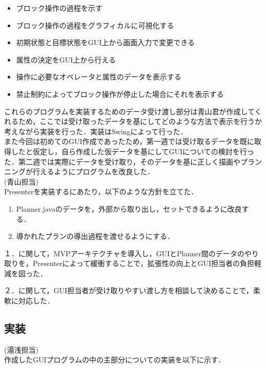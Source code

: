 \documentclass[uplatex,12pt]{jsarticle}
\begin{document}
\begin{itemize}
\item ブロック操作の過程を示す
\item ブロック操作の過程をグラフィカルに可視化する
\item 初期状態と目標状態をGUI上から画面入力で変更できる
\item 属性の決定をGUI上から行える
\item 操作に必要なオペレータと属性のデータを表示する
\item 禁止制約によってブロック操作が停止した場合にそれを表示する
\end{itemize}

これらのプログラムを実装するためのデータ受け渡し部分は青山君が作成してくれるため，ここでは受け取ったデータを基にしてどのような方法で表示を行うか考えながら実装を行った．実装はSwingによって行った．\\

また今回は初めてのGUI作成であったため，第一週では受け取るデータを既に取得したと仮定し，自ら作成した仮データを基にしてGUIについての検討を行った．第二週では実際にデータを受け取り，そのデータを基に正しく描画やプランニングが行えるようにプログラムを改良した．\\

\noindent (青山担当) \\
Presenterを実装するにあたり，以下のような方針を立てた．
\begin{enumerate}
\item Planner.javaのデータを，外部から取り出し，セットできるように改良する．
\item 導かれたプランの導出過程を渡せるようにする．
\end{enumerate}

１．に関して，MVPアーキテクチャを導入し，GUIとPlanner間のデータのやり取りを，Presenterによって緩衝することで，拡張性の向上とGUI担当者の負担軽減を図った．

２．に関して，GUI担当者が受け取りやすい渡し方を相談して決めることで，柔軟に対応した．

\subsection{実装}
\noindent (湯浅担当) \\
作成したGUIプログラムの中の主部分についての実装を以下に示す．\\
\end{document}
